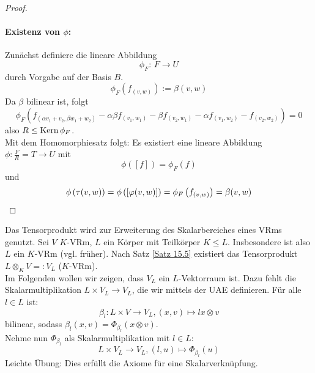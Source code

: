 \documentclass[parskip,a4paper,twoside,DIV15,BCOR12mm]{scrbook}
\begin{document}
\begin{proof}
\paragraph{Existenz von \(\phi\):}{Zunächst definiere die lineare Abbildung
\[
\phi_{F}:\,F\to U
\]
durch Vorgabe auf der Basis \(B\).
\[
\phi_{F}\left(f_{(v,w)}\right):=\beta(v,w)
\]
Da \(\beta\) bilinear ist, folgt
\[
\phi_{F}\left(f_{(\alpha v_{1}+v_{2},\beta w_{1}+w_{2})}-
    \alpha\beta f_{(v_{1},w_{1})}-\beta f_{(v_{2},w_{1})}-
    \alpha f_{(v_{1},w_{2})}-f_{(v_{2},w_{2})}\right)
=0
\]
also \(R\leq\operatorname{Kern}\phi_{F}\).\\
Mit dem Homomorphiesatz folgt: Es existiert eine lineare Abbildung 
\(\phi:\frac{F}{R}=T\to U\) mit 
\[
\phi([f])=\phi_{F}(f)
\]
und
\[
\phi\left(\tau(v,w)\right)=\phi\left([\varphi(v,w)]\right)
    =\phi_{F}\left(f_{(v,w)}\right)=\beta(v,w)
\]
}
\end{proof}

\begin{application}
Das Tensorprodukt wird zur Erweiterung des Skalarbereiches eines VRms genutzt.
Sei $V$ $K$-VRm, $L$ ein Körper mit Teilkörper $K\le L$. Insbesondere ist also
$L$ ein $K$-VRm (vgl. früher). Nach Satz \ref{Satz 15.5} existiert das 
Tensorprodukt $L\otimes_K V=:V_L$ ($K$-VRm).\\
Im Folgenden wollen wir zeigen, dass $V_L$ ein $L$-Vektorraum ist. Dazu fehlt
die Skalarmultiplikation $L\times V_L\to V_L$, die wir mittels der UAE definieren.
Für alle $l\in L$ ist:
\[\beta_l:L\times V\to V_L,(x,v)\mapsto lx\otimes v\]
bilinear, sodass $\beta_l(x,v)=\Phi_{\beta_l}(x\otimes v)$.\\
Nehme nun $\Phi_{\beta_l}$ als Skalarmultiplikation mit $l\in L$:
\[L\times V_L\to V_L,(l,u)\mapsto \Phi_{\beta_l}(u)\]
Leichte Übung: Dies erfüllt die Axiome für eine Skalarverknüpfung.
\end{application}

\begin{comment}
$V_L$ enthält $V$ als $K$-Untervektorraum über die Einbettung:
\[V\to V_L,v\mapsto 1\otimes v\]
Für eine Basis $B$ von $V$ ist das Bild $\{1\otimes b\mid b\in B\}\subseteq V_L$
eine Basis des $L$-VRms $V_L$. Insbesondere ist
\[L\otimes_K K^n\stackrel{\sim}{=}L^n\]
eine Isomorphie von $L$-VRmen.
\end{comment}
\end{document}
